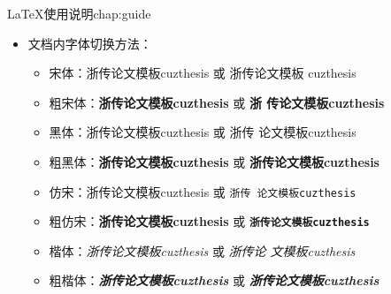 \begin{cuzchapter}{\LaTeX{}使用说明}{chap:guide}
\begin{itemize}
\begin{itemize}
			      \item 文档超链接的颜色及其显示：修改 \verb|\hypersetup|
		      \end{itemize}
		\item 文档内字体切换方法：
		      \begin{itemize}
			      \item 宋体：浙传论文模板cuzthesis 或 \textrm{浙传论文模板
				            cuzthesis}
			      \item 粗宋体：{\bfseries 浙传论文模板cuzthesis} 或 \textbf{浙
				            传论文模板cuzthesis}
			      \item 黑体：{\sffamily 浙传论文模板cuzthesis} 或 \textsf{浙传
				            论文模板cuzthesis}
			      \item 粗黑体：{\bfseries\sffamily 浙传论文模板cuzthesis} 或
			            \textsf{\bfseries 浙传论文模板cuzthesis}
			      \item 仿宋：{\ttfamily 浙传论文模板cuzthesis} 或 \texttt{浙传
				            论文模板cuzthesis}
			      \item 粗仿宋：{\bfseries\ttfamily 浙传论文模板cuzthesis} 或
			            \texttt{\bfseries 浙传论文模板cuzthesis}
			      \item 楷体：{\itshape 浙传论文模板cuzthesis} 或 \textit{浙传论
				            文模板cuzthesis}
			      \item 粗楷体：{\bfseries\itshape 浙传论文模板cuzthesis} 或
			            \textit{\bfseries 浙传论文模板cuzthesis}
		      \end{itemize}
	\end{itemize}

\end{cuzchapter}
